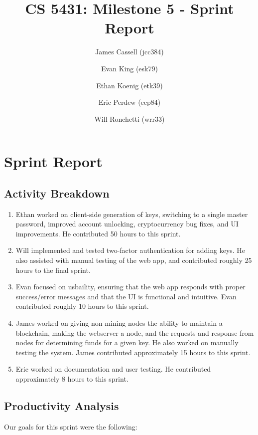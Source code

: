 \documentclass[a4paper,12pt]{article}
\title{CS 5431: Milestone 5 - Sprint Report}
\author{
James Cassell (jcc384)
\and
Evan King (esk79)
\and
Ethan Koenig (etk39)
\and
Eric Perdew (ecp84)
\and
Will Ronchetti (wrr33)
}
\begin{document}
\maketitle

\section{Sprint Report}

\subsection{Activity Breakdown}

\begin{enumerate} %
\item Ethan worked on client-side generation of keys, switching to a single master password, improved account unlocking, cryptocurrency bug fixes, and UI improvements. He contributed 50 hours to this sprint.
\item Will implemented and tested two-factor authentication for adding keys. He also assisted with manual testing of the web app, and contributed roughly 25 hours to the final sprint.
\item Evan focused on usbaility, ensuring that the web app responds with proper success/error messages and that the UI is functional and intuitive. Evan contributed roughly 10 hours to this sprint.
\item James worked on giving non-mining nodes the ability to maintain a blockchain, making the webserver a node, and the requests and response from nodes for determining funds for a given key.
  He also worked on manually testing the system.
  James contributed approximately 15 hours to this sprint.
\item Eric worked on documentation and user testing.
He contributed approximately 8 hours to this sprint.
\end{enumerate}

\subsection{Productivity Analysis}

Our goals for this sprint were the following:
\end{document}
